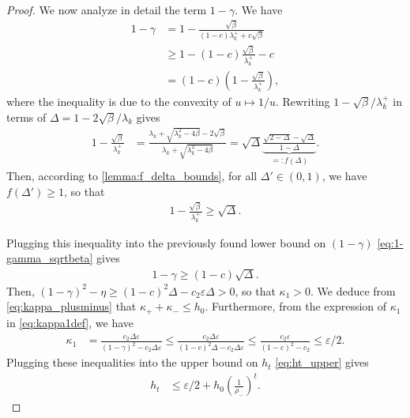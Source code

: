 \documentclass[10pt,a4paper]{amsart}
\begin{document}
\begin{proof}
  We now analyze in detail the term $1-\gamma$. We have
  \begin{align}
    1-\gamma & = 1 - \frac{\sqrt{\beta}}{(1-c)\lambda_k^+ + c\sqrt{\beta}} \nonumber\\
    & \geqslant 1 - (1-c)\frac{\sqrt{\beta}}{\lambda_k^+} - c \nonumber\\
    & = (1-c)\left(1 - \frac{\sqrt{\beta}}{\lambda_k^+}\right), \label{eq:1-gamma_sqrtbeta}
  \end{align}
  where the inequality is due to the convexity of $u\mapsto 1/u$. Rewriting $1-\sqrt{\beta}/\lambda_k^+$ in terms of $\Delta = 1 - 2\sqrt{\beta}/\lambda_k$ gives
  \begin{align}\label{eq:1_gamma_fdelta}
    1 - \frac{\sqrt{\beta}}{\lambda_k^+} & = \frac{\lambda_k + \sqrt{\lambda_k^2 - 4\beta} - 2\sqrt{\beta}}{\lambda_k + \sqrt{\lambda_k^2 - 4\beta}} = \sqrt{\Delta} \underbrace{\frac{\sqrt{2-\Delta} - \sqrt{\Delta}}{1 - \Delta}}_{=: f(\Delta)}.
  \end{align}
  Then, according to \cref{lemma:f_delta_bounds}, for all $\Delta' \in (0,1)$, we have $f(\Delta' ) \geqslant 1$, so that
  \begin{align*}
    1 - \frac{\sqrt{\beta}}{\lambda_k^+} \geqslant \sqrt{\Delta}.
  \end{align*}

  Plugging this inequality into the previously found lower bound on $(1-\gamma)$ \eqref{eq:1-gamma_sqrtbeta} gives
  \begin{align}\label{eq:1minusgamma_ineq}
    1 - \gamma \geqslant (1-c) \sqrt{\Delta}.
  \end{align}
  Then, $(1 - \gamma)^2 - \eta \geqslant (1-c)^2 \Delta - c_2 \varepsilon \Delta > 0$, so that $\kappa_1 > 0$. We deduce from \eqref{eq:kappa_plusminus} that $\kappa_+ + \kappa_- \leqslant h_0$. Furthermore, from the expression of $\kappa_1$ in \eqref{eq:kappa1def}, we have
  \begin{align*}
    \kappa_1 & = \frac{c_2 \Delta\varepsilon}{(1-\gamma)^2 - c_2 \Delta\varepsilon} \leqslant \frac{c_2 \Delta\varepsilon}{(1-c)^2 \Delta - c_2 \Delta\varepsilon} \leqslant \frac{c_2 \varepsilon}{(1 - c)^2 - c_2} \leqslant \varepsilon/2.
  \end{align*}
  Plugging these inequalities into the upper bound on $h_t$ \eqref{eq:ht_upper} gives
  \begin{align}\label{eq:ht_intermediate}
    h_t & \leqslant  \varepsilon/2 + h_0 \left(\frac{1}{\rho_-}\right)^t.
  \end{align}


\end{proof}
\end{document}
